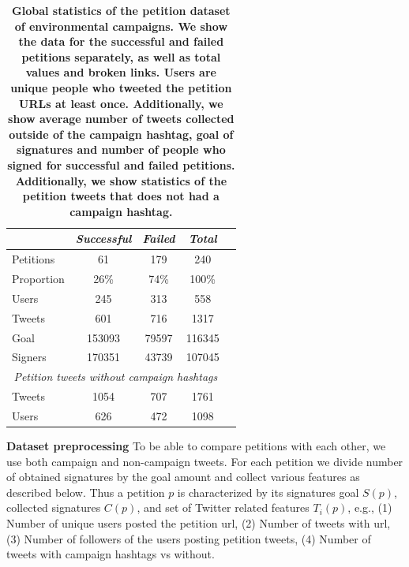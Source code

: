 \begin{table}[hbt!]
\centering
\begin{tabular}{lcccc}
			& \textit{Successful} & \textit{Failed} &  \textit{Total}	\\ \midrule
Petitions			& 61		& 179		& 240		\\
Proportion			& 26\%		& 74\%		& 100\%		\\
Users 				& 245		& 313		& 558		\\
Tweets				& 601		& 716		& 1317		\\
Goal				& 153093	& 79597		& 116345	\\
Signers				& 170351	& 43739		& 107045	\\ \midrule
\multicolumn{4}{c}{\textit{Petition tweets without campaign hashtags}}	\\ \midrule
Tweets				& 1054		& 707		& 1761		\\
Users 				& 626		& 472		& 1098		\\
\end{tabular}
\caption{\textbf{Global statistics of the petition dataset of environmental campaigns. We show the data for the successful and failed petitions separately, as well as total values and broken links. Users are unique people who tweeted the petition URLs at least once. Additionally, we show average number of tweets collected outside of the campaign hashtag, goal of signatures and number of people who signed for successful and failed petitions. Additionally, we show statistics of the petition tweets that does not had a campaign hashtag.}
\label{tab:petition_tweets}}
\end{table}

\textbf{Dataset preprocessing}
To be able to compare petitions with each other, we use both campaign and non-campaign tweets.
For each petition we divide number of obtained signatures by the goal amount and collect various features as described below.
Thus a petition $p$ is characterized by its signatures goal $S(p)$, collected signatures $C(p)$, and set of Twitter related features $T_i(p)$, e.g., (1) Number of unique users posted the petition url, (2) Number of tweets with url, (3) Number of followers of the users posting petition tweets, (4) Number of tweets with campaign hashtags vs without.